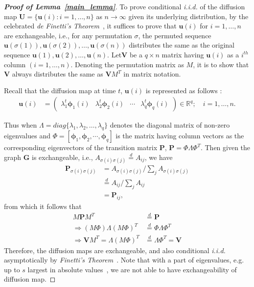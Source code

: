 \documentclass[11pt]{article}
\theoremstyle{definition}
\begin{document}
\begin{proof}[\textbf{Proof of Lemma~\ref{main_lemma}}]
To prove conditional \textit{i.i.d.} of the diffusion map $\mathbf{U} = \{\mathbf{u}(i) : i=1,\ldots,n\}$ as $n \rightarrow \infty$ given its underlying distribution, by the celebrated \textit{de Finetti's Theorem}~\cite{diaconis1980finite}, it suffices to prove that $\mathbf{u}(i)$ for $i=1,\ldots,n$ are exchangeable, i.e., for any permutation $\sigma$, the permuted sequence $\mathbf{u}(\sigma(1)), \mathbf{u}(\sigma(2)), \ldots,\mathbf{u}(\sigma(n))$ distributes the same as the original sequence $\mathbf{u}(1), \mathbf{u}(2), \ldots,\mathbf{u}(n)$. Let$\mathbf{V}$ be a $q \times n$ matrix having $\mathbf{u}(i)$ as a $i^{th}$ column $(i = 1, \ldots, n)$. Denoting the permutation matrix as $M$, it is to show that $\mathbf{V}$ always distributes the same as $\mathbf{V} M^{T}$ in matrix notation. 
	
Recall that the diffusion map at time $t$, $\mathbf{u}(i)$ is represented as follows :
\begin{align}
\mathbf{u}(i)  &= \begin{pmatrix} \lambda^{t}_{1} \mathbf{\phi}_{1}(i) & \lambda^{t}_{2} \mathbf{\phi}_{2} (i)  & \cdots & \lambda^{t}_{q} \mathbf{\phi}_{q}(i) \end{pmatrix} \in \mathbb{R}^{q}; \quad i = 1, \ldots, n.
\end{align}

Thus when $\Lambda=diag\{ \lambda_{1},\lambda_2,\ldots,\lambda_q \}$ denotes the diagonal matrix of non-zero eigenvalues and $\Phi =[ \mathbf{\phi}_1, \mathbf{\phi}_2,\cdots, \mathbf{\phi}_q ]$ is the matrix having column vectors as the corresponding eigenvectors of the transition matrix $\mathbf{P}$, $\mathbf{P}=\Phi \Lambda \Phi^{T}$. Then given the graph $\mathbf{G}$ is exchangeable, i.e., $A_{\sigma(i)\sigma(j)} \stackrel{d}{=} A_{ij}$, we have
\begin{align*}
\mathbf{P}_{\sigma(i) \sigma(j)} &= A_{\sigma(i) \sigma(j)} / \sum\limits_{j} A_{\sigma(i)\sigma(j)} \\
 &\stackrel{d}{=} A_{ij} /  \sum\limits_{j} A_{ij} \\
&= \mathbf{P}_{ij},
\end{align*}
 from which it follows that
\begin{align*}
	 M \mathbf{P} M^{T} &\stackrel{d}{=} \mathbf{P} \\
	  \Rightarrow (M \Phi) \Lambda (M \Phi)^{T} &\stackrel{d}{=} \Phi \Lambda \Phi^{T} \\
		\Rightarrow \mathbf{V} M^{T}= \Lambda (M \Phi)^{T} &\stackrel{d}{=} \Lambda \Phi^{T} = \mathbf{V}
\end{align*}	
Therefore, the diffusion maps are exchangeable, and also conditional \textit{i.i.d.} asymptotically by \textit{Finetti’s Theorem}~\cite{diaconis1980finite,orbanz2015bayesian}. Note that with a part of eigenvalues, e.g. up to $s$ largest in absolute values~\cite{coifman2006diffusion}, we are not able to have exchangeability of diffusion map.
\end{proof}
\end{document}
